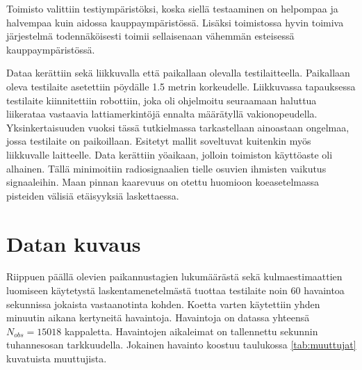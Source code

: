 \documentclass[
  12pt,
  a4paper, twoside]{book}
\begin{document}
\noindent Toimisto valittiin testiympäristöksi, koska siellä testaaminen on helpompaa ja halvempaa kuin aidossa kauppaympäristössä. Lisäksi toimistossa hyvin toimiva järjestelmä todennäköisesti toimii sellaisenaan vähemmän esteisessä kauppaympäristössä.

Dataa kerättiin sekä liikkuvalla että paikallaan olevalla testilaitteella. Paikallaan oleva testilaite asetettiin pöydälle 1.5 metrin korkeudelle. Liikkuvassa tapauksessa testilaite kiinnitettiin robottiin, joka oli ohjelmoitu seuraamaan haluttua liikerataa vastaavia lattiamerkintöjä ennalta määrätyllä vakionopeudella. Yksinkertaisuuden vuoksi tässä tutkielmassa tarkastellaan ainoastaan ongelmaa, jossa testilaite on paikoillaan. Esitetyt mallit soveltuvat kuitenkin myös liikkuvalle laitteelle. Data kerättiin yöaikaan, jolloin toimiston käyttöaste oli alhainen. Tällä minimoitiin radiosignaalien tielle osuvien ihmisten vaikutus signaaleihin. Maan pinnan kaarevuus on otettu huomioon koeasetelmassa pisteiden välisiä etäisyyksiä laskettaessa.

\section{Datan kuvaus}

Riippuen päällä olevien paikannustagien lukumäärästä sekä kulmaestimaattien luomiseen käytetystä laskentamenetelmästä tuottaa testilaite noin \(60\) havaintoa sekunnissa jokaista vastaanotinta kohden. Koetta varten käytettiin yhden minuutin aikana kertyneitä havaintoja. Havaintoja on datassa yhteensä \(N_{obs}=15018\) kappaletta. Havaintojen aikaleimat on tallennettu sekunnin tuhannesosan tarkkuudella. Jokainen havainto koostuu taulukossa \ref{tab:muuttujat} kuvatuista muuttujista.
\end{document}
